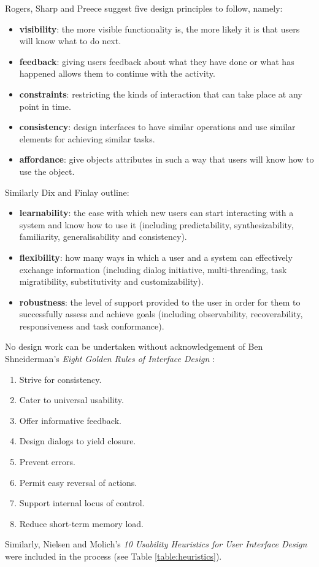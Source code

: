 Rogers, Sharp and Preece \citep[p.~26-29]{RogersPreece} suggest five design principles to follow, namely:
\begin{itemize}
 \item  \textbf{visibility}: the more visible functionality is, the more likely it is that users will know what to do next.
\item \textbf{feedback}: giving users feedback about what they have done or what has happened allows them to continue with the activity.
\item \textbf{constraints}: restricting the kinds of interaction that can take place at any point in time.
\item \textbf{consistency}: design interfaces to have similar operations and use similar elements for achieving similar tasks.
\item \textbf{affordance}: give objects attributes in such a way that users will know how to use the object.
\end{itemize}
Similarly Dix and Finlay \citep[p. 260]{DixFinlay} outline: 
\begin{itemize}
 \item \textbf{learnability}: the ease with which new users can start interacting with a system and know how to use it (including predictability, synthesizability, familiarity, generalisability and consistency). 
 \item  \textbf{flexibility}: how many ways in which a user and a system can effectively exchange information (including dialog initiative, multi-threading, task migratibility, substitutivity and customizability).
 \item  \textbf{robustness}: the level of support provided to the user in order for them to successfully assess and achieve goals (including observability, recoverability, responsiveness and task conformance). 
\end{itemize}

No design work can be undertaken without acknowledgement of Ben Shneiderman's \textit{Eight Golden Rules of Interface Design} \citep{ShneidermanPlaisant}:
\begin{enumerate}
 \item Strive for consistency.
 \item  Cater to universal usability.
 \item Offer informative feedback.
 \item Design dialogs to yield closure.
 \item Prevent errors.
 \item Permit easy reversal of actions.
 \item Support internal locus of control.
 \item Reduce short-term memory load.
\end{enumerate}
Similarly, Nielsen and Molich's \textit{10 Usability Heuristics for User Interface Design} \citep[p. 249]{NielsenHeuristics} were included in the process (see  Table \ref{table:heuristics}).

